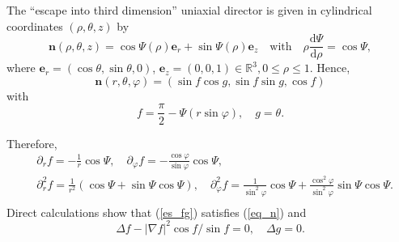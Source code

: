 \documentclass[10pt, a4paper]{article}
\newcommand\dd{\mathrm{d}}
\newcommand\n{\mathbf{n}}
\newcommand\e{\mathbf{e}}
\newcommand\pp{\partial}
\begin{document}
The ``escape into third dimension'' uniaxial director is given in cylindrical coordinates $(\rho, \theta, z)$ by
\begin{equation}
\label{third_dim}
\n(\rho, \theta, z) = \cos \Psi(\rho) \mathbf{e}_r + \sin \Psi(\rho) \mathbf{e}_z \quad \text{with} \quad \rho \frac{\dd \Psi}{\dd \rho} = \cos \Psi,
\end{equation}
where $\e_r = (\cos \theta, \sin \theta, 0)$, $\e_z = (0, 0, 1) \in \mathbb{R}^3, 0 \leq \rho \leq 1$. Hence,
\begin{equation}
\n(r, \theta, \varphi) = (\sin f \cos g, \sin f \sin g, \cos f)
\end{equation}
with
\begin{equation}\label{es_fg}
f = \frac{\pi}{2} - \Psi(r \sin \varphi), \quad g = \theta.
\end{equation}

Therefore,
\begin{equation}
\begin{aligned}
& \pp_r f = - \frac{1}{r} \cos \Psi, \quad \pp_{\varphi} f = -\frac{\cos \varphi}{\sin \varphi} \cos \Psi, \\
& \pp_r^2 f = \frac{1}{r^2} (\cos \Psi + \sin \Psi \cos \Psi), \quad \pp_{\varphi}^2 f = \frac{1}{\sin^2 \varphi} \cos \Psi + \frac{\cos^2 \varphi}{\sin^2 \varphi} \sin \Psi \cos \Psi. \\
\end{aligned}
\end{equation}
Direct calculations show that (\ref{es_fg}) satisfies (\ref{eq_n}) and %
\begin{equation}
\Delta f - |\nabla f|^2 \cos f / \sin f = 0, \quad \Delta g = 0.
\end{equation}
\end{document}
